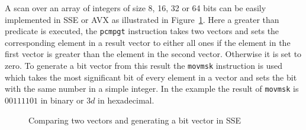 A scan over an array of integers of size 8, 16, 32 or 64 bits can be
easily implemented in SSE or AVX as illustrated in
Figure~\ref{fig:simplecomparesse}. Here a greater than predicate is executed,
the \texttt{pcmpgt} instruction takes two vectors and sets the corresponding
element in a result vector to either all ones if the element in the first
vector is greater than the element in the second vector. Otherwise it is set to
zero. To generate a bit vector from this result the \texttt{movmsk} instruction
is used which takes the most significant bit of every element in a vector and
sets the bit with the same number in a simple integer. In the example the
result of \texttt{movmsk} is $00111101$ in binary or $3d$ in hexadecimal.

\begin{figure}\center
{}
\caption{Comparing two vectors and generating a bit vector in SSE}
\label{fig:simplecomparesse}
\end{figure}

